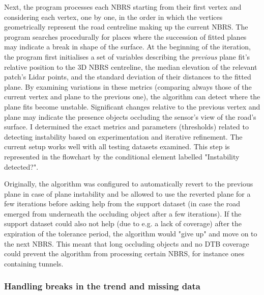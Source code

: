 Next, the program processes each NBRS starting from their first vertex and considering each vertex, one by one, in the order in which the vertices geometrically represent the road centreline making up the current NBRS. The program searches procedurally for places where the succession of fitted planes may indicate a break in shape of the surface. At the beginning of the iteration, the program first initialises a set of variables describing the \textit{previous} plane fit's relative position to the 3D NBRS centreline, the median elevation of the relevant patch's Lidar points, and the standard deviation of their distances to the fitted plane. By examining variations in these metrics (comparing always those of the current vertex and plane to the previous one), the algorithm can detect where the plane fits become unstable. Significant changes relative to the previous vertex and plane may indicate the presence objects occluding the sensor's view of the road's surface. I determined the exact metrics and parameters (thresholds) related to detecting instability based on experimentation and iterative refinement. The current setup works well with all testing datasets examined. This step is represented in the flowchart by the conditional element labelled "Instability detected?".

Originally, the algorithm was configured to automatically revert to the previous plane in case of plane instability and be allowed to use the reverted plane for a few iterations before asking help from the support dataset (in case the road emerged from underneath the occluding object after a few iterations). If the support dataset could also not help (due to e.g. a lack of coverage) after the expiration of the tolerance period, the algorithm would "give up" and move on to the next NBRS. This meant that long occluding objects and no DTB coverage could prevent the algorithm from processing certain NBRS, for instance ones containing tunnels.

\subsubsection{Handling breaks in the trend and missing data}

